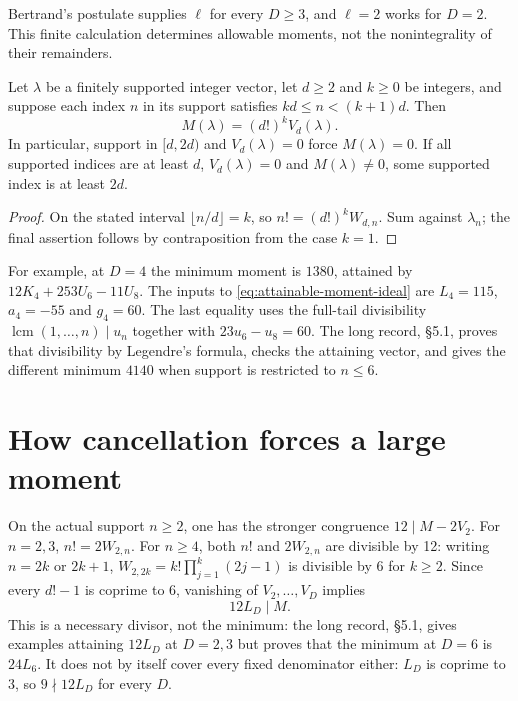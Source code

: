 \documentclass[11pt]{article}
\begin{document}
Bertrand's postulate supplies $\ell$ for every $D\ge3$, and $\ell=2$
works for $D=2$. This finite calculation determines allowable moments,
not the nonintegrality of their remainders.

\begin{theorem}
\label{res:bandbreakpoint}
Let $\lambda$ be a finitely supported integer vector, let $d\ge2$ and
$k\ge0$ be integers, and suppose each index $n$ in its support satisfies
$kd\le n<(k+1)d$.  Then
\[
  M(\lambda)=(d!)^k V_d(\lambda).
\]
In particular, support in $[d,2d)$ and $V_d(\lambda)=0$ force
$M(\lambda)=0$.  If all supported indices are at least $d$,
$V_d(\lambda)=0$ and $M(\lambda)\ne0$, some supported index is at least $2d$.
\end{theorem}
\begin{proof}
On the stated interval $\lfloor n/d\rfloor=k$, so
$n!=(d!)^kW_{d,n}$.  Sum against $\lambda_n$; the final assertion follows
by contraposition from the case $k=1$.
\end{proof}

For example, at $D=4$ the minimum moment is $1380$, attained by
$12K_4+253U_6-11U_8$. The inputs to
\eqref{eq:attainable-moment-ideal} are $L_4=115$, $a_4=-55$ and $g_4=60$.
The last equality uses the full-tail divisibility
$\operatorname{lcm}(1,\ldots,n)\mid u_n$ together with
$23u_6-u_8=60$.
\label{eq:channel-lcm-envelope}
The long record, \S5.1, proves that divisibility by Legendre's formula,
checks the attaining vector, and gives the different minimum $4140$ when
support is restricted to $n\le6$.

\section{How cancellation forces a large moment}\label{sec:translator}

On the actual support $n\ge2$, one has the stronger congruence
$12\mid M-2V_2$.  For $n=2,3$, $n!=2W_{2,n}$.  For $n\ge4$, both
$n!$ and $2W_{2,n}$ are divisible by 12: writing $n=2k$ or $2k+1$,
$W_{2,2k}=k!\prod_{j=1}^k(2j-1)$ is divisible by 6 for $k\ge2$.
Since every $d!-1$ is coprime to 6, vanishing of $V_2,\ldots,V_D$ implies
\begin{equation}
12L_D\mid M.\label{eq:twelve-lcm}
\end{equation}
This is a necessary divisor, not the minimum: the long record, \S5.1,
gives examples attaining $12L_D$ at $D=2,3$ but proves that the minimum
at $D=6$ is $24L_6$. It does not by itself cover every fixed denominator
either: $L_D$ is coprime to $3$, so $9\nmid12L_D$ for every $D$.
\end{document}
